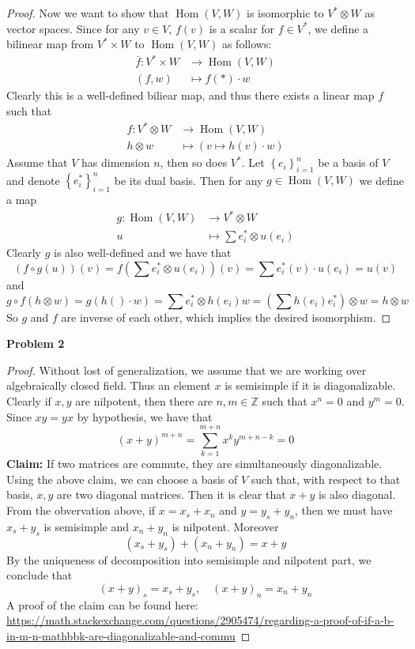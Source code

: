 \documentclass[12pt]{article} %
\DeclareMathOperator{\Hom}{Hom}
\begin{document}
\begin{proof}
    Now we want to show that $\Hom(V,W)$ is isomorphic to $V^*\otimes W$ as vector spaces. Since for any
    $v \in V$, $f(v)$ is a scalar for $f \in V^*$, we define a bilinear map from $V^* \times W$ to $\Hom(V,W)$ as follows:
    \begin{align*}
        \overline{f} \colon V^* \times W &\to \Hom(V,W) \\
        (f,w) &\mapsto f(*)\cdot w
    \end{align*}
    Clearly this is a well-defined biliear map, and thus there exists a linear map $f$ such that
    \begin{align*}
        f \colon V^* \otimes W &\to \Hom(V,W) \\
        h\otimes w &\mapsto (v\mapsto h(v)\cdot w)
    \end{align*}
    Assume that $V$ has dimension $n$, then so does $V^*$. Let $\left\lbrace e_i\right\rbrace_{i=1}^n$ be a basis of $V$ and
    denote $\left\lbrace e^*_i\right\rbrace_{i=1}^n$ be its dual basis. Then for any $g \in \Hom(V,W)$ we define a map
    \begin{align*}
        g \colon  \Hom(V,W) &\to V^* \otimes W \\
       u &\mapsto \sum e_i^* \otimes u(e_i)
    \end{align*}
    Clearly $g$ is also well-defined and we have that 
    \[(f\circ g(u))(v) = f\left(\sum e_i^* \otimes u(e_i)\right)(v) = \sum e_i^*(v)\cdot u(e_i)=u(v)\]
    and 
    \[g\circ f (h\otimes w)=g(h()\cdot w)=\sum e_i^* \otimes h(e_i)w = (\sum h(e_i)e_i^*)\otimes w=h\otimes w \]
So $g$ and $f$ are inverse of each other, which implies the desired isomorphism.
\end{proof}
\textbf{Problem 2}
\begin{proof}
    Without lost of generalization, we assume that we are working over algebraically closed field.
    Thus an element $x$ is semisimple if it is diagonalizable. Clearly if $x,y$ are nilpotent, then there are $n,m \in \mathbb{Z}$ such that
    $x^n=0$ and $y^m=0$. Since $xy=yx$ by hypothesis, we have that
    \[(x+y)^{m+n} = \sum_{k=1}^{m+n} x^k y^{m+n-k} = 0\]
    \textbf{Claim:} If two matrices are commute, they are simultaneously diagonalizable. 
    Using the above claim, we can choose a basis of $V$ such that, with respect to that basis, $x,y$ are two diagonal matrices. 
    Then it is clear that $x+y$ is also diagonal. 
    From the obvervation above, if $x = x_s+x_n$ and $y=y_s+y_n$, then we must have
    $x_s+y_s$ is semisimple and $x_n+y_n$ is nilpotent. Moreover
    \[(x_s+y_s)+(x_n+y_n) = x+y\]
    By the uniqueness of decomposition into semisimple and nilpotent part, we conclude that
    \[(x+y)_s=x_s+y_s,\quad (x+y)_n = x_n+y_n\]
    A proof of the claim can be found here: \url{https://math.stackexchange.com/questions/2905474/regarding-a-proof-of-if-a-b-in-m-n-mathbbk-are-diagonalizable-and-commu}
\end{proof}
\end{document}
